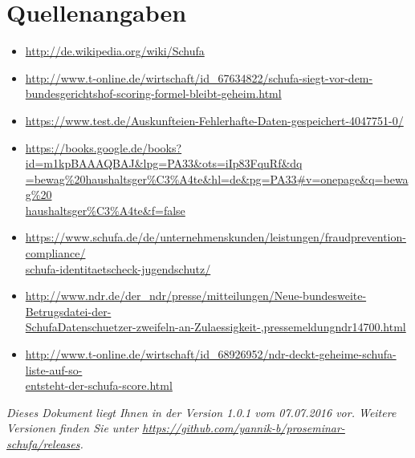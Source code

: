 \documentclass[12pt]{article}
\begin{document}
\section{Quellenangaben}
\begin{itemize}
\item \href{http://de.wikipedia.org/wiki/Schufa}{http://de.wikipedia.org/wiki/Schufa}
\item \href{http://www.t-online.de/wirtschaft/id\_67634822/schufa-siegt-vor-dem-bundesgerichtshof-scoring-formel-bleibt-geheim.html}{http://www.t-online.de/wirtschaft/id\_67634822/schufa-siegt-vor-dem-bundesgerichtshof-scoring-formel-bleibt-geheim.html}
\item \href{https://www.test.de/Auskunfteien-Fehlerhafte-Daten-gespeichert-4047751-0/}{https://www.test.de/Auskunfteien-Fehlerhafte-Daten-gespeichert-4047751-0/}
\item \href{https://books.google.de/books?id=m1kpBAAAQBAJ\&lpg=PA33\&ots=iIp83FquRf\&dq=bewag\%20haushaltsger\%C3\%A4te\&hl=de\&pg=PA33\#v=onepage\&q=bewag\%20haushaltsger\%C3\%A4te\&f=false}{https://books.google.de/books?id=m1kpBAAAQBAJ\&lpg=PA33\&ots=iIp83FquRf\&dq\\=bewag\%20haushaltsger\%C3\%A4te\&hl=de\&pg=PA33\#v=onepage\&q=bewag\%20\\haushaltsger\%C3\%A4te\&f=false}
\item \href{https://www.schufa.de/de/unternehmenskunden/leistungen/fraudprevention-compliance/schufa-identitaetscheck-jugendschutz/}{https://www.schufa.de/de/unternehmenskunden/leistungen/fraudprevention-compliance/\\schufa-identitaetscheck-jugendschutz/}
\item \href{http://www.ndr.de/der\_ndr/presse/mitteilungen/Neue-bundesweite-Betrugsdatei-der-SchufaDatenschuetzer-zweifeln-an-Zulaessigkeit-,pressemeldungndr14700.html}{http://www.ndr.de/der\_ndr/presse/mitteilungen/Neue-bundesweite-Betrugsdatei-der-\\SchufaDatenschuetzer-zweifeln-an-Zulaessigkeit-,pressemeldungndr14700.html}
\item \href{http://www.t-online.de/wirtschaft/id\_68926952/ndr-deckt-geheime-schufa-liste-auf-so-entsteht-der-schufa-score.html}{http://www.t-online.de/wirtschaft/id\_68926952/ndr-deckt-geheime-schufa-liste-auf-so-\\entsteht-der-schufa-score.html}
\end{itemize}

\begin{small}
\textit{Dieses Dokument liegt Ihnen in der Version 1.0.1 vom 07.07.2016 vor. Weitere Versionen finden Sie unter 
\href{https://github.com/yannik-b/proseminar-schufa/releases}{https://github.com/yannik-b/proseminar-schufa/releases}.}
\end{small}
\end{document}
